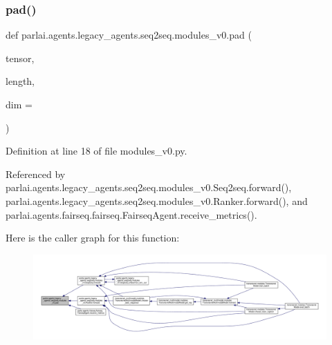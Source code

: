 \subsubsection{\texorpdfstring{pad()}{pad()}}
{\footnotesize\ttfamily def parlai.\+agents.\+legacy\+\_\+agents.\+seq2seq.\+modules\+\_\+v0.\+pad (\begin{DoxyParamCaption}\item[{}]{tensor,  }\item[{}]{length,  }\item[{}]{dim = {} }\end{DoxyParamCaption})}



Definition at line 18 of file modules\+\_\+v0.\+py.



Referenced by parlai.\+agents.\+legacy\+\_\+agents.\+seq2seq.\+modules\+\_\+v0.\+Seq2seq.\+forward(), parlai.\+agents.\+legacy\+\_\+agents.\+seq2seq.\+modules\+\_\+v0.\+Ranker.\+forward(), and parlai.\+agents.\+fairseq.\+fairseq.\+Fairseq\+Agent.\+receive\+\_\+metrics().

Here is the caller graph for this function\+:
\nopagebreak
\begin{figure}[H]
\begin{center}
\leavevmode
\includegraphics[width=350pt]{namespaceparlai_1_1agents_1_1legacy__agents_1_1seq2seq_1_1modules__v0_afab760d03d96d6a368953b7173ea189a_icgraph}
\end{center}
\end{figure}

